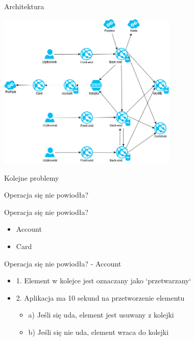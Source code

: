 \documentclass{beamer}
\begin{document}
\begin{frame}{Architektura}
	\begin{center}
		\includegraphics[height=7.5cm]{architektura6.png}
	\end{center}
\end{frame}

\begin{frame}{Kolejne problemy}
	\begin{center}
		\Huge{Operacja się nie powiodła?}
	\end{center}
\end{frame}

\begin{frame}{Operacja się nie powiodła?}
	\begin{huge}
		\begin{itemize}
			\item Account
			\item Card
		\end{itemize}
	\end{huge}
\end{frame}

\begin{frame}{Operacja się nie powiodła? - Account}
	\begin{Large}
		\begin{itemize}[<+->]
			\item[] 1. Element w kolejce jest oznaczany jako `przetwarzany`
			\item[] 2. Aplikacja ma 10 sekund na przetworzenie elementu
			\begin{itemize}[<+->]
				\item[] \Large{a) Jeśli się uda, element jest usuwany z kolejki}
				\item[] \Large{b) Jeśli się nie uda, element wraca do kolejki}
			\end{itemize}
		\end{itemize}
	\end{Large}
\end{frame}
\end{document}
